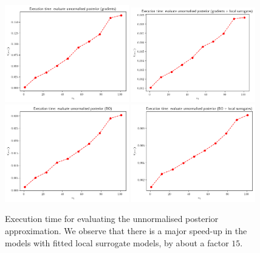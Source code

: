 \begin{figure}[ht]
    \begin{center}
      \includegraphics[width=0.48\textwidth]{./Thesis/images/chapter4/exec_posterior_grad.png}
      \includegraphics[width=0.48\textwidth]{./Thesis/images/chapter4/exec_posterior_grad_fit.png}\\
      \includegraphics[width=0.48\textwidth]{./Thesis/images/chapter4/exec_posterior_bo.png}
      \includegraphics[width=0.48\textwidth]{./Thesis/images/chapter4/exec_posterior_bo_fit.png}
    \end{center}
    \caption[Execution time for evaluation the unnormalised posterior.]{Execution time for evaluating the unnormalised posterior
      approximation. We observe that there is a major speed-up in the
      models with fitted local surrogate models, by about a factor $15$.}
  \label{fig:exec_posterior}
\end{figure}



